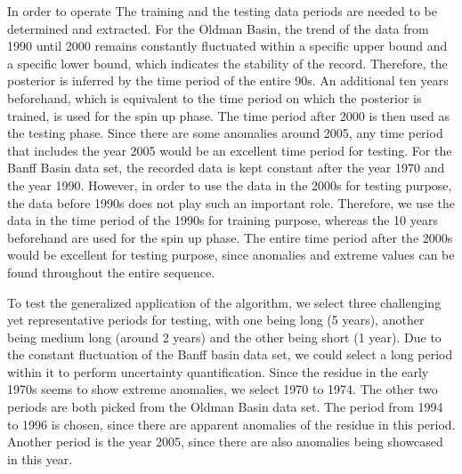 In order to operate The training and the testing data periods are needed to be determined and extracted. For the Oldman Basin, the trend of the data from 1990 until 2000 remains constantly fluctuated within a specific upper bound and a specific lower bound, which indicates the stability of the record. Therefore, the posterior is inferred by the time period of the entire 90s. An additional ten years beforehand, which is equivalent to the time period on which the posterior is trained, is used for the spin up phase. The time period after 2000 is then used as the testing phase. Since there are some anomalies around 2005, any time period that includes the year 2005 would be an excellent time period for testing. For the Banff Basin data set, the recorded data is kept constant after the year 1970 and the year 1990. However, in order to use the data in the 2000s for testing purpose, the data before 1990s does not play such an important role. Therefore, we use the data in the time period of the 1990s for training purpose, whereas the 10 years beforehand are used for the spin up phase. The entire time period after the 2000s would be excellent for testing purpose, since anomalies and extreme values can be found throughout the entire sequence.

To test the generalized application of the algorithm, we select three challenging yet representative periods for testing, with one being long (5 years), another being medium long (around 2 years) and the other being short (1 year). Due to the constant fluctuation of the Banff basin data set, we could select a long period within it to perform uncertainty quantification. Since the residue in the early 1970s seems to show extreme anomalies, we select 1970 to 1974. The other two periods are both picked from the Oldman Basin data set. The period from 1994 to 1996 is chosen, since there are apparent anomalies of the residue in this period. Another period is the year 2005, since there are also anomalies being showcased in this year.
